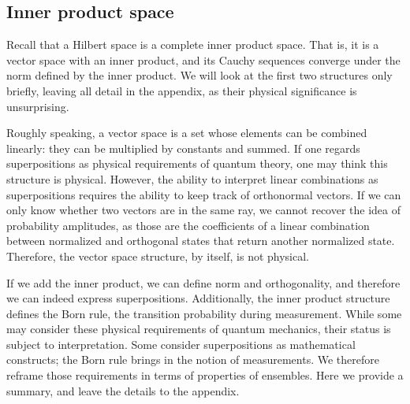 \documentclass[10pt,twocolumn, nofootinbib]{revtex4-2}
\begin{document}
\subsection{Inner product space}

Recall that a Hilbert space is a complete inner product space. That is, it is a vector space with an inner product, and its Cauchy sequences converge under the norm defined by the inner product. We will look at the first two structures only briefly, leaving all detail in the appendix, as their physical significance is unsurprising.

Roughly speaking, a vector space is a set whose elements can be combined linearly: they can be multiplied by constants and summed. If one regards superpositions as physical requirements of quantum theory, one may think this structure is physical. However, the ability to interpret linear combinations as superpositions requires the ability to keep track of orthonormal vectors. If we can only know whether two vectors are in the same ray, we cannot recover the idea of probability amplitudes, as those are the coefficients of a linear combination between normalized and orthogonal states that return another normalized state. Therefore, the vector space structure, by itself, is not physical.

If we add the inner product, we can define norm and orthogonality, and therefore we can indeed express superpositions. Additionally, the inner product structure defines the Born rule, the transition probability during measurement. While some may consider these physical requirements of quantum mechanics, their status is subject to interpretation. Some consider superpositions as mathematical constructs; the Born rule brings in the notion of measurements. We therefore reframe those requirements in terms of properties of ensembles. Here we provide a summary, and leave the details to the appendix.
\end{document}
